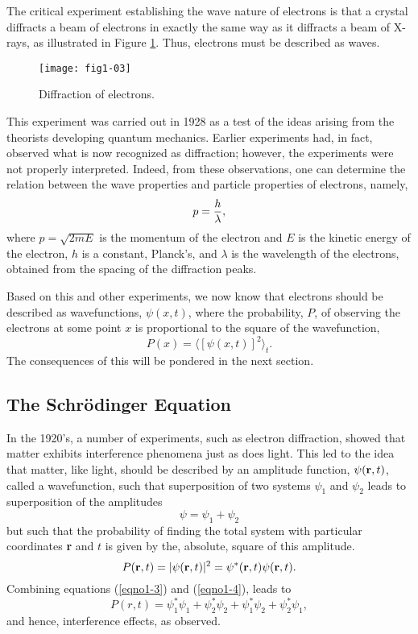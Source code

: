 The critical experiment establishing the wave nature of electrons is
that a crystal diffracts a beam of electrons in exactly the same way
as it diffracts a beam of X-rays, as illustrated in Figure
\ref{fig1-3}. Thus, electrons must be described as waves.
\begin{figure}
\texttt{[image: fig1-03]}
\caption{Diffraction of electrons.}
\label{fig1-3}
\end{figure}


This experiment was carried out in 1928 as a test of the ideas arising
from the theorists developing quantum mechanics. Earlier experiments
had, in fact, observed what is now recognized as diffraction; however,
the experiments were not properly interpreted.  Indeed, from these
observations, one can determine the relation between the wave
properties and particle properties of electrons, namely,
\begin{equation}
p = {h \over \lambda} ,
\end{equation}
where $p = \sqrt{2mE}$ is the momentum of the electron and $E$ is the
kinetic energy of the electron, $h$ is a constant, Planck's, and
$\lambda$ is the wavelength of the electrons, obtained from the
spacing of the diffraction peaks.

Based on this and other experiments, we now know that electrons should
be described as wavefunctions, $\psi(x,t)$, where the probability,
$P$, of observing the electrons at some point $x$ is proportional to
the square of the wavefunction,
\begin{equation}
P(x) = \langle \left[ \psi (x,t) \right]^2 \rangle_t .
\end{equation}
The consequences of this will be pondered in the next section.

\subsection{The Schr\"odinger Equation}

In the 1920's, a number of experiments, such as electron diffraction,
showed that matter exhibits interference phenomena just as does
light. This led to the idea that matter, like light, should be
described by an amplitude function, $\psi ( {\bf r} , t)$, called a
wavefunction, such that superposition of two systems $\psi_1$ and
$\psi_2$ leads to superposition of the amplitudes
\begin{equation}
\psi = \psi_1 + \psi_2 
\label{eqno1-3}
\end{equation}
but such that the probability of finding the total system with
particular coordinates {\bf r} and $t$ is given by the, absolute,
square of this amplitude.
\begin{equation}
P( {\bf r} , t) = \vert \psi ( {\bf r} , t ) \vert^2 = \psi ^* ( {\bf r} , 
t ) \psi ( {\bf r} , t ) .
\label{eqno1-4}
\end{equation}
Combining equations (\ref{eqno1-3}) and (\ref{eqno1-4}), leads to
\begin{equation}
P (r , t) = \psi^*_1 \psi_1 + \psi^*_2 \psi_2 + \psi^*_1 \psi_2 + \psi^*_2 
\psi_1 ,
\end{equation}
and hence, interference effects, as observed.


